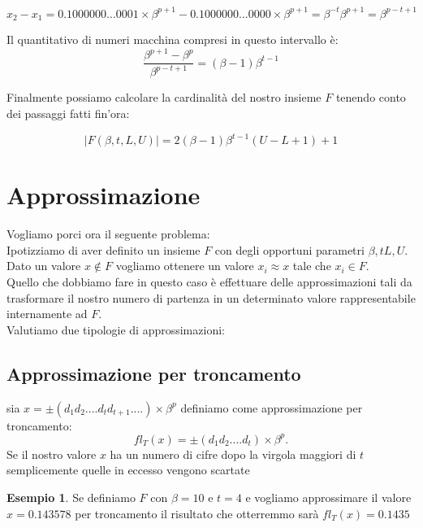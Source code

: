 \documentclass[12pt, a4paper]{book}
\theoremstyle{definition}
\newtheorem{exmp}{Esempio}[section]
\begin{document}
\begin{flushleft}
\[ x_{2} - x_{1} = 0.1000000...0001 \times \beta^{p+1} - 0.1000000...0000 \times \beta^{p+1} = \beta^{-t}\beta^{p+1} = \beta^{p-t+1} \]

Il quantitativo di numeri macchina compresi in questo intervallo è: 
\[ \frac{\beta^{p+1} - \beta^{p}}{\beta^{p-t+1}}  =(\beta-1)\beta^{t-1}\]

Finalmente possiamo calcolare la cardinalità del nostro insieme $F$ tenendo conto dei passaggi fatti fin'ora: 

\[ |F(\beta, t, L,U)| = 2(\beta-1)\beta^{t-1}(U-L+1) + 1\]


\end{flushleft}

\section{Approssimazione}
\begin{flushleft}
Vogliamo porci ora il seguente problema: \\
Ipotizziamo di aver definito un insieme $F$ con degli opportuni parametri $\beta, t L,U$. Dato un valore $x \notin F$ vogliamo ottenere un valore $x_{i} \approx x$ tale che $x_{i} \in F$.\\
Quello che dobbiamo fare in questo caso è effettuare delle approssimazioni tali da trasformare il nostro numero di partenza in un determinato valore rappresentabile internamente ad $F$. \\
Valutiamo due tipologie di approssimazioni: 
\end{flushleft}

\subsection{Approssimazione per troncamento}
\begin{flushleft}
sia $x = \pm(d_{1}d_{2}....d_{t}d_{t+1}....)\times \beta^{p}$ definiamo come approssimazione per troncamento: 
\[ 
	fl_{T}(x) = \pm(d_{1}d_{2}....d_{t})\times \beta^{p}.
\]
Se il nostro valore $x$ ha un numero di cifre dopo la virgola maggiori di $t$ semplicemente quelle in eccesso vengono scartate

\begin{exmp}
Se definiamo $F$ con $\beta = 10 $ e $t = 4$ e vogliamo approssimare il valore $x = 0.143578$ per troncamento il risultato che otterremmo sarà $ fl_{T}(x) = 0.1435 $
\end{exmp}
\end{flushleft}
\end{document}
